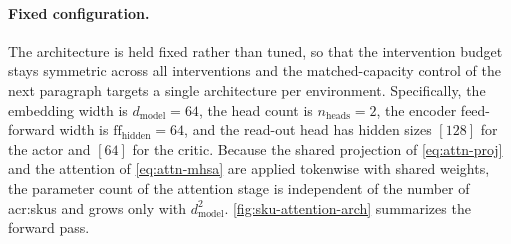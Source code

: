 \paragraph{\textbf{Fixed configuration.}} The architecture is held fixed rather
than tuned, so that the intervention budget stays symmetric across all
interventions and the matched-capacity control of the next paragraph targets a
single architecture per environment. Specifically, the embedding width is $d_{\mathrm{model}}=64$,
the head count is $n_{\mathrm{heads}}=2$, the encoder feed-forward width is
$\mathrm{ff}_{\mathrm{hidden}}=64$, and the read-out head has hidden sizes $[128]$
for the actor and $[64]$ for the critic. Because the shared projection of
\autoref{eq:attn-proj} and the attention of \autoref{eq:attn-mhsa} are applied
tokenwise with shared weights, the parameter count of the attention stage is
independent of the number of \glspl{acr:sku} and grows only with
$d_{\mathrm{model}}^2$. \autoref{fig:sku-attention-arch} summarizes the forward
pass.



